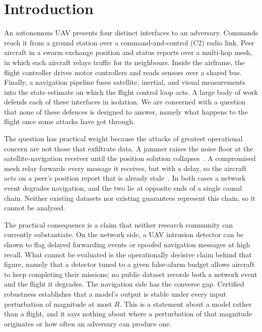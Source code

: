\section{Introduction}
\label{sec:intro}
An autonomous UAV presents four distinct interfaces to an adversary. Commands
reach it from a ground station over a command-and-control (C2) radio link. Peer
aircraft in a swarm exchange position and status reports over a multi-hop mesh,
in which each aircraft relays traffic for its neighbours. Inside the airframe,
the flight controller drives motor controllers and reads sensors over a shared
bus. Finally, a navigation pipeline fuses satellite, inertial, and visual
measurements into the state estimate on which the flight control loop acts. A
large body of work defends each of these interfaces in isolation. We are
concerned with a question that none of these defences is designed to answer,
namely what happens to the flight once some attacks have got through.

The question has practical weight because the attacks of greatest operational
concern are not those that exfiltrate data. A jammer raises the noise floor at
the satellite-navigation receiver until the position solution
collapses~\cite{kassas2022jammer}. A compromised mesh relay forwards every
message it receives, but with a delay, so the aircraft acts on a peer's position
report that is already stale~\cite{datamut2026,lou2019timedelay}. In both cases
a network event degrades navigation, and the two lie at opposite ends of a
single causal chain. Neither existing datasets nor existing guarantees represent
this chain, so it cannot be analysed.

The practical consequence is a claim that neither research community can
currently substantiate. On the network side, a UAV intrusion detector can be
shown to flag delayed forwarding events or spoofed navigation messages at high
recall. What cannot be evaluated is the operationally decisive claim behind that
figure, namely that a detector tuned to a given false-alarm budget allows
aircraft to keep completing their missions; no public dataset records both a
network event and the flight it degrades. The navigation side has the converse
gap. Certified robustness establishes that a model's output is stable under
every input perturbation of magnitude at most $R$. This is a statement about a
model rather than a flight, and it says nothing about where a perturbation of
that magnitude originates or how often an adversary can produce one.

